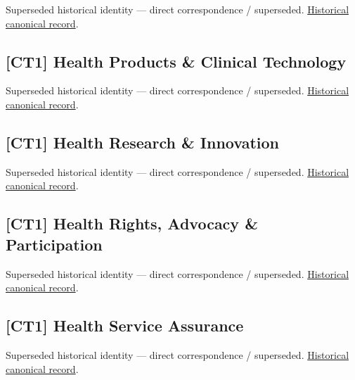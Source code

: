 \par\label{element:a1c557bd263047d0b3ff566cf50b98c1}
Superseded historical identity — direct correspondence / superseded. \href{../../../../continuum/strategy/capability/a1c557bd263047d0b3ff566cf50b98c1.md}{Historical canonical record}.\par

\subsection{[CT1] Health Products \& Clinical Technology}

\par\label{element:a631a8600b8b49df9ef452c48c91349a}
Superseded historical identity — direct correspondence / superseded. \href{../../../../continuum/strategy/capability/a631a8600b8b49df9ef452c48c91349a.md}{Historical canonical record}.\par

\subsection{[CT1] Health Research \& Innovation}

\par\label{element:2cc31384c8864c73989025cbe96dcfa7}
Superseded historical identity — direct correspondence / superseded. \href{../../../../continuum/strategy/capability/2cc31384c8864c73989025cbe96dcfa7.md}{Historical canonical record}.\par

\subsection{[CT1] Health Rights, Advocacy \& Participation}

\par\label{element:58376e5c53bf4af0a54f99f21ac52666}
Superseded historical identity — direct correspondence / superseded. \href{../../../../continuum/strategy/capability/58376e5c53bf4af0a54f99f21ac52666.md}{Historical canonical record}.\par

\subsection{[CT1] Health Service Assurance}

\par\label{element:6a82dc1423374e809dbf542eeaa69482}
Superseded historical identity — direct correspondence / superseded. \href{../../../../continuum/strategy/capability/6a82dc1423374e809dbf542eeaa69482.md}{Historical canonical record}.\par

